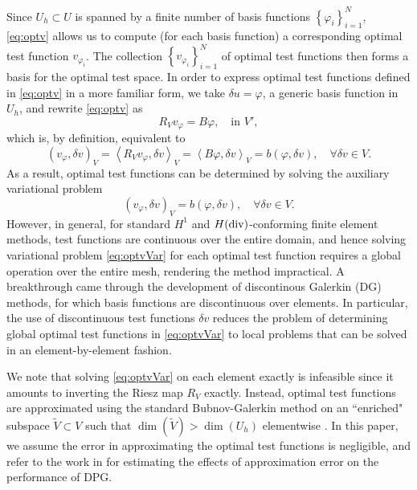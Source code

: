 \documentclass[11pt,onecolumn]{scrartcl}
\newcommand{\eqnlab}[1]{\label{eq:#1}}
\newcommand{\eqnref}[1]{\eqref{eq:#1}}
\newcommand{\LRp}[1]{\left( #1 \right)}
\newcommand{\LRa}[1]{\left\langle #1 \right\rangle}
\newcommand{\LRc}[1]{\left\{ #1 \right\}}
\begin{document}
Since $U_h \subset U$ is spanned by a finite number of basis functions $\LRc{\varphi_i}_{i=1}^N$, \eqnref{optv} allows us to compute (for each basis function) a corresponding optimal test function $v_{\varphi_i}$. The collection $\LRc{v_{\varphi_i}}_{i = 1}^N$ of optimal test functions then forms a basis for the optimal test space.  In order to express optimal test functions defined in \eqnref{optv} in a more familiar form, we take  $\delta u = \varphi$, a generic basis function in $U_h$, and rewrite \eqnref{optv} as
\[
R_Vv_{\varphi} = B\varphi, \quad \text{in } V',
\]
which is, by definition, equivalent to
\[
\LRp{v_\varphi,\delta v}_V = \LRa{R_Vv_\varphi,\delta v}_{V}=
\LRa{B\varphi, \delta v}_V = b\LRp{\varphi,\delta v}, \quad
\forall \delta v \in V.
\]
As a result, optimal test functions can be determined by solving the auxiliary
variational problem
\begin{equation}
\eqnlab{optvVar}
\left(v_\varphi,\delta v\right)_V = b(\varphi,\delta v), \quad \forall
\delta v \in V.
\end{equation}
However, in general, for standard $H^1$ and $H({\rm div})$-conforming finite element methods, test functions are continuous over the entire domain, and hence solving variational problem \eqnref{optvVar} for each optimal test function requires a global operation over the entire mesh, rendering the method impractical. A breakthrough came through the development of
discontinous Galerkin (DG) methods, for which basis functions are
discontinuous over elements. In particular, the use of discontinuous
test functions $\delta v$ reduces the problem of determining global 
optimal test functions
in \eqnref{optvVar} to local problems that can be solved in an
element-by-element fashion.

We note that solving \eqnref{optvVar} on each element exactly is
infeasible since it amounts to inverting the Riesz map $R_V$ exactly.
Instead, optimal test functions are approximated using the standard
Bubnov-Galerkin method on an ``enriched" subspace $\tilde{V} \subset
V$ such that $\dim(\tilde{V}) > \dim(U_h)$ elementwise \cite{DPG1, DPG2}. In this
paper, we assume the error in approximating the optimal test functions
is negligible, and refer to the work in \cite{practicalDPG} for
estimating the effects of approximation error on the performance of DPG.
\end{document}
